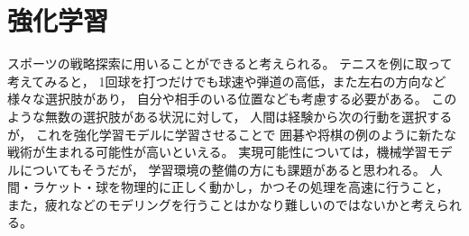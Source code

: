 \documentclass[dvipdfmx, fleqn, titlepage]{jsarticle}
\begin{document}
\section{強化学習}

スポーツの戦略探索に用いることができると考えられる。
テニスを例に取って考えてみると，
1回球を打つだけでも球速や弾道の高低，また左右の方向など様々な選択肢があり，
自分や相手のいる位置なども考慮する必要がある。
このような無数の選択肢がある状況に対して，
人間は経験から次の行動を選択するが，
これを強化学習モデルに学習させることで
囲碁や将棋の例のように新たな戦術が生まれる可能性が高いといえる。
実現可能性については，機械学習モデルについてもそうだが，
学習環境の整備の方にも課題があると思われる。
人間・ラケット・球を物理的に正しく動かし，かつその処理を高速に行うこと，
また，疲れなどのモデリングを行うことはかなり難しいのではないかと考えられる。
\end{document}
